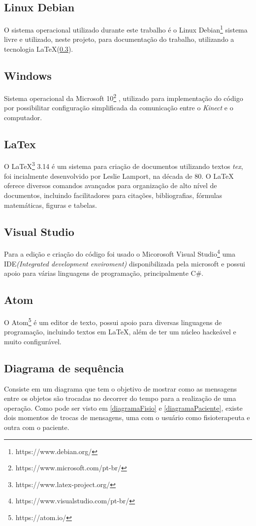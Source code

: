 \subsection{Linux Debian}\label{sub:linuxdebian}
		O sistema operacional utilizado durante este trabalho é o Linux Debian\footnote{https://www.debian.org/} sistema livre
e utilizado, neste projeto, para documentação do trabalho, utilizando a
tecnologia LaTeX(\ref{sub:latex}).

\subsection{Windows}\label{sub:windows}
Sistema operacional da Microsoft 10\footnote{https://www.microsoft.com/pt-br/} , utilizado para implementação do código
por possibilitar configuração simplificada da comunicação entre o \textit{Kinect} e o computador.

\subsection{LaTex}\label{sub:latex}
O LaTeX\footnote{https://www.latex-project.org/} 3.14 é um sistema para criação de documentos utilizando textos \textit{tex},
 foi incialmente desenvolvido por Leslie Lamport, na década de 80. O LaTeX oferece diversos comandos avançados para organização
 de alto nível de documentos, incluindo facilitadores para citações, bibliografias, fórmulas matemáticas, figuras e tabelas.

 \subsection{Visual Studio}\label{sub:codigo}
   Para a edição e criação do código foi usado o Micorosoft Visual Studio\footnote{https://www.visualstudio.com/pt-br/} uma IDE\textit{(Integrated development enviroment)} disponibilizada pela microsoft
e possui apoio para várias linguagens de programação, principalmente C\#.

\subsection{Atom}\label{sub:atom}
		O Atom\footnote{https://atom.io/} é um editor de texto, possui apoio para diversas linguagens de programação, incluindo textos em LaTeX, além de
ter um núcleo hackeável e muito configurável.



\subsection{Diagrama de sequência}\label{sub:diagramaSequencia}
  Consiste em um diagrama que tem o objetivo de mostrar como as mensagens entre os objetos são trocadas no decorrer do tempo para a realização de uma operação.\cite{diagramaSequencia}
Como pode ser visto em \ref{diagramaFisio} e \ref{diagramaPaciente}, existe dois momentos de trocas de mensagens, uma com o usuário como fisioterapeuta e outra
com o paciente.

